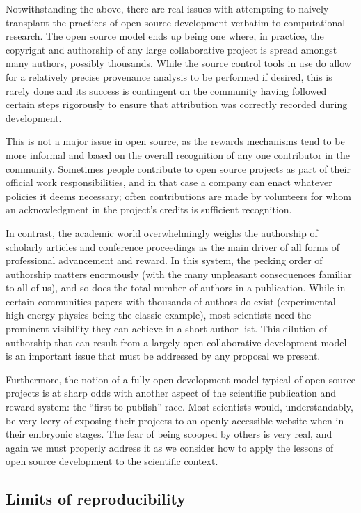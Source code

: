 \documentclass[ChapterTOCs,krantz2]{krantz} %
\begin{document}
Notwithstanding the above, there are real issues with attempting to
naively transplant the practices of open source development verbatim
to computational research. The open source model ends up being one
where, in practice, the copyright and authorship of any large collaborative
project is spread amongst many authors, possibly thousands. While
the source control tools in use do allow for a relatively precise
provenance analysis to be performed if desired, this is rarely done
and its success is contingent on the community having followed certain
steps rigorously to ensure that attribution was correctly recorded
during development.

This is not a major issue in open source, as the rewards mechanisms
tend to be more informal and based on the overall recognition of any
one contributor in the community. Sometimes people contribute to open
source projects as part of their official work responsibilities, and
in that case a company can enact whatever policies it deems necessary;
often contributions are made by volunteers for whom an acknowledgment
in the project's credits is sufficient recognition.

In contrast, the academic world overwhelmingly weighs the authorship
of scholarly articles and conference proceedings as the main driver
of all forms of professional advancement and reward. In this system,
the pecking order of authorship matters enormously (with the many
unpleasant consequences familiar to all of us), and so does the total
number of authors in a publication. While in certain communities papers
with thousands of authors do exist (experimental high-energy physics
being the classic example), most scientists need the prominent visibility
they can achieve in a short author list. This dilution of authorship
that can result from a largely open collaborative development model
is an important issue that must be addressed by any proposal we present.

Furthermore, the notion of a fully open development model typical
of open source projects is at sharp odds with another aspect of the
scientific publication and reward system: the ``first
to publish'' race. Most scientists would, understandably,
be very leery of exposing their projects to an openly accessible website
when in their embryonic stages. The fear of being scooped by others
is very real, and again we must properly address it as we consider
how to apply the lessons of open source development to the scientific
context.


\subsection{Limits of reproducibility}
\end{document}
